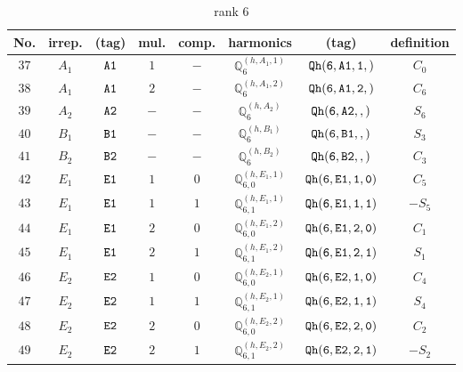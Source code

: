 \documentclass[fleqn,8pt]{jsarticle}
\begin{document}
\begin{table}[ht!]
\begin{center}
\caption{rank 6}
\renewcommand{\arraystretch}{1.3}
\begin{tabular}{cccccccc} \hline \hline
No. & irrep. & (tag) & mul. & comp. & harmonics & (tag) & definition \\ \hline
$ 37 $ & $ A_{1} $ & $ {\tt A1} $ & $ 1 $ & $ - $ & $ \mathbb{Q}_{6}^{(h,A_{1},1)} $ & $ {\tt Qh(6,A1,1,)} $ & $ C_{0} $ \\
$ 38 $ & $ A_{1} $ & $ {\tt A1} $ & $ 2 $ & $ - $ & $ \mathbb{Q}_{6}^{(h,A_{1},2)} $ & $ {\tt Qh(6,A1,2,)} $ & $ C_{6} $ \\
$ 39 $ & $ A_{2} $ & $ {\tt A2} $ & $ - $ & $ - $ & $ \mathbb{Q}_{6}^{(h,A_{2})} $ & $ {\tt Qh(6,A2,,)} $ & $ S_{6} $ \\
$ 40 $ & $ B_{1} $ & $ {\tt B1} $ & $ - $ & $ - $ & $ \mathbb{Q}_{6}^{(h,B_{1})} $ & $ {\tt Qh(6,B1,,)} $ & $ S_{3} $ \\
$ 41 $ & $ B_{2} $ & $ {\tt B2} $ & $ - $ & $ - $ & $ \mathbb{Q}_{6}^{(h,B_{2})} $ & $ {\tt Qh(6,B2,,)} $ & $ C_{3} $ \\
$ 42 $ & $ E_{1} $ & $ {\tt E1} $ & $ 1 $ & $ 0 $ & $ \mathbb{Q}_{6,0}^{(h,E_{1},1)} $ & $ {\tt Qh(6,E1,1,0)} $ & $ C_{5} $ \\
$ 43 $ & $ E_{1} $ & $ {\tt E1} $ & $ 1 $ & $ 1 $ & $ \mathbb{Q}_{6,1}^{(h,E_{1},1)} $ & $ {\tt Qh(6,E1,1,1)} $ & $ - S_{5} $ \\
$ 44 $ & $ E_{1} $ & $ {\tt E1} $ & $ 2 $ & $ 0 $ & $ \mathbb{Q}_{6,0}^{(h,E_{1},2)} $ & $ {\tt Qh(6,E1,2,0)} $ & $ C_{1} $ \\
$ 45 $ & $ E_{1} $ & $ {\tt E1} $ & $ 2 $ & $ 1 $ & $ \mathbb{Q}_{6,1}^{(h,E_{1},2)} $ & $ {\tt Qh(6,E1,2,1)} $ & $ S_{1} $ \\
$ 46 $ & $ E_{2} $ & $ {\tt E2} $ & $ 1 $ & $ 0 $ & $ \mathbb{Q}_{6,0}^{(h,E_{2},1)} $ & $ {\tt Qh(6,E2,1,0)} $ & $ C_{4} $ \\
$ 47 $ & $ E_{2} $ & $ {\tt E2} $ & $ 1 $ & $ 1 $ & $ \mathbb{Q}_{6,1}^{(h,E_{2},1)} $ & $ {\tt Qh(6,E2,1,1)} $ & $ S_{4} $ \\
$ 48 $ & $ E_{2} $ & $ {\tt E2} $ & $ 2 $ & $ 0 $ & $ \mathbb{Q}_{6,0}^{(h,E_{2},2)} $ & $ {\tt Qh(6,E2,2,0)} $ & $ C_{2} $ \\
$ 49 $ & $ E_{2} $ & $ {\tt E2} $ & $ 2 $ & $ 1 $ & $ \mathbb{Q}_{6,1}^{(h,E_{2},2)} $ & $ {\tt Qh(6,E2,2,1)} $ & $ - S_{2} $ \\
 \hline \hline
\end{tabular}
\end{center}
\end{table}
\end{document}
